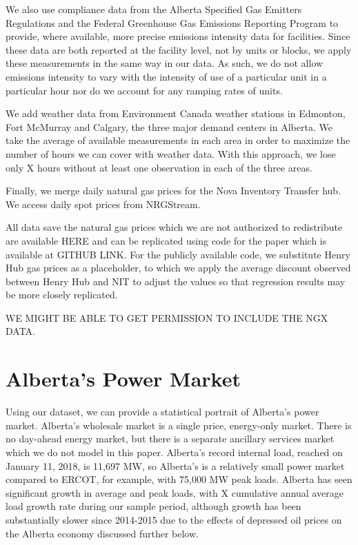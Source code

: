 \documentclass[12pt]{article}
\begin{document}
We also use compliance data from the Alberta Specified Gas Emitters Regulations and the Federal Greenhouse Gas Emissions Reporting Program to provide, where available, more precise emissions intensity data for facilities.  Since these data are both reported at the facility level, not by units or blocks, we apply these measurements in the same way in our data.  As such, we do not allow emissions intensity to vary with the intensity of use of a particular unit in a particular hour nor do we account for any ramping rates of units.

We add weather data from Environment Canada weather stations in Edmonton, Fort McMurray and Calgary, the three major demand centers in Alberta.  We take the average of available measurements in each area in order to maximize the number of hours we can cover with weather data.  With this approach, we lose only X hours without at least one observation in each of the three areas.


Finally, we merge daily natural gas prices for the Nova Inventory Transfer hub.  We access daily spot prices from NRGStream.


All data save the natural gas prices which we are not authorized to redistribute are available HERE and can be replicated using code for the paper which is available at GITHUB LINK. For the publicly available code, we substitute Henry Hub gas prices as a placeholder, to which we apply the average discount observed between Henry Hub and NIT to adjust the values so that regression results may be more closely replicated.

WE MIGHT BE ABLE TO GET PERMISSION TO INCLUDE THE NGX DATA.




\section{Alberta's Power Market}

Using our dataset, we can provide a statistical portrait of Alberta's power market. Alberta's wholesale market is a single price, energy-only market. There is no day-ahead energy market, but there is a separate ancillary services market which we do not model in this paper.  Alberta's record internal load, reached on January 11, 2018, is 11,697 MW, so Alberta's is a relatively small power market compared to ERCOT, for example, with 75,000 MW peak loads.  Alberta has seen significant growth in average and peak loads, with X cumulative annual average load growth rate during our sample period, although growth has been substantially slower since 2014-2015 due to the effects of depressed oil prices on the Alberta economy discussed further below.
\end{document}
